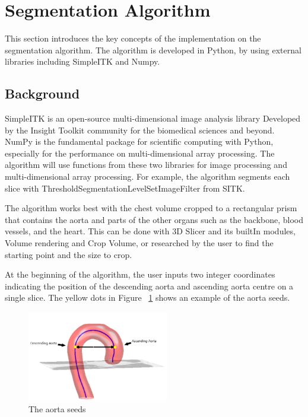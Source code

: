 \section{Segmentation Algorithm}

This section introduces the key concepts of the implementation on the segmentation algorithm. The algorithm is developed in Python, by using external libraries including SimpleITK and Numpy. 

\subsection{Background}

SimpleITK is an open-source multi-dimensional image analysis library Developed by the Insight Toolkit community for the biomedical sciences and beyond. NumPy is the fundamental package for scientific computing with Python, especially for the performance on multi-dimensional array processing. The algorithm will use functions from these two libraries for image processing and multi-dimensional array processing. For example, the algorithm segments each slice with ThresholdSegmentationLevelSetImageFilter from SITK.

The algorithm works best with the chest volume cropped to a rectangular prism that contains the aorta and parts of the other organs such as the backbone, blood vessels, and the heart. This can be done with 3D Slicer and its builtIn modules, Volume rendering and Crop Volume, or researched by the user to find the starting point and the size to crop.

At the beginning of the algorithm, the user inputs two integer coordinates indicating the position of the descending aorta and ascending aorta centre on a single slice. The yellow dots in Figure ~\ref{fig_aorta_seed} shows an example of the aorta seeds.

\begin{figure}[ht]
    \centering
    \includegraphics[width=0.55\textwidth]{figures/Sample/Aorta_seeds.png}
    \caption[The Aorta Seeds]{The aorta seeds \citep{6346433}}
    \label{fig_aorta_seed}
\end{figure}

